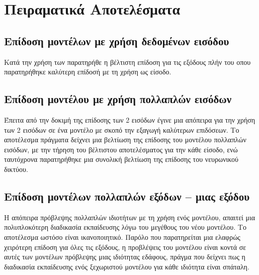 \chapter{Πειραματικά Αποτελέσματα}
\label{ch:experiments_results}

\section{Επίδοση μοντέλων με χρήση δεδομένων εισόδου }
Κατά την χρήση των  παρατηρήθε η βέλτιστη επίδοση για τις εξόδους  πλήν του  οπου παρατηρήθηκε καλύτερη επίδοσή με τη χρήση  ως είσοδο.

\section{Επίδοση μοντέλου με χρήση πολλαπλών εισόδων}
Έπειτα από την δοκιμή της επίδοσης των 2 εισόδων έγινε μια απόπειρα για την χρήση των 2 εισόδων σε ένα μοντέλο με σκοπό την εξαγωγή καλύτερων επιδόσεων. Το αποτέλεσμα πράγματα δείχνει μια βελτίωση της επίδοσης του μοντέλου πολλαπλών εισόδων, με την τήρηση του βέλτιστου αποτελέσματος για την κάθε είσοδο, ενώ ταυτόχρονα παρατηρήθηκε μια συνολική βελτίωση της επίδοσης του νευρωνικού δικτύου.

\section{Επίδοση μοντέλων πολλαπλών εξόδων -- μιας εξόδου}
Η απόπειρα πρόβλεψης πολλαπλών ιδιοτήτων με τη χρήση ενός μοντέλου, απαιτεί μια πολυπλοκότερη διαδικασία εκπαίδευσης λόγω του μεγέθους του νέου μοντέλου. Το αποτέλεσμα ωστόσο είναι ικανοποιητικό. Παρόλο που παρατηρείται μια ελαφρώς χειρότερη επίδοση για όλες τις εξόδους, η προβλέψεις του μοντέλου είναι κοντά σε αυτές των μοντέλων πρόβλεψης μιας ιδιότητας εδάφους, πράγμα που δείχνει πως η διαδικασία εκπαίδευσης ενός ξεχωριστού μοντέλου για κάθε ιδιότητα είναι σπάταλη.

